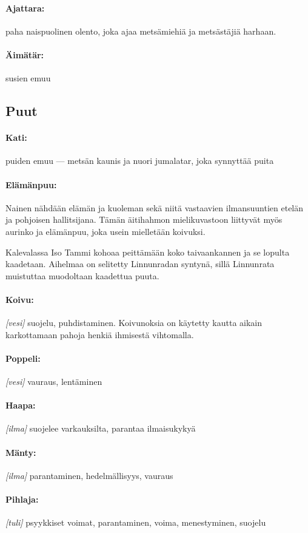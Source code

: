   \paragraph{Ajattara:} paha naispuolinen olento, joka ajaa metsämiehiä ja metsästäjiä harhaan.
  \paragraph{Äimätär:} susien emuu


\subsection{Puut}

  \paragraph{Kati:} puiden emuu --- metsän kaunis ja nuori jumalatar, joka synnyttää puita
  \paragraph{Elämänpuu:} Nainen nähdään elämän ja kuoleman sekä niitä vastaavien ilmansuuntien
    etelän ja pohjoisen hallitsijana. Tämän äitihahmon mielikuvastoon liittyvät myös aurinko ja
    elämänpuu, joka usein mielletään koivuksi. \par
    Kalevalassa Iso Tammi kohoaa peittämään koko taivaankannen ja se lopulta kaadetaan. Aihelmaa
    on selitetty Linnunradan syntynä, sillä Linnunrata muistuttaa muodoltaan kaadettua puuta.
  \paragraph{Koivu:} \emph{[vesi]} suojelu, puhdistaminen. Koivunoksia on käytetty kautta aikain
    karkottamaan pahoja henkiä ihmisestä vihtomalla.
  \paragraph{Poppeli:} \emph{[vesi]} vauraus, lentäminen
  \paragraph{Haapa:} \emph{[ilma]} suojelee varkauksilta, parantaa ilmaisukykyä
  \paragraph{Mänty:} \emph{[ilma]} parantaminen, hedelmällisyys, vauraus
  \paragraph{Pihlaja:} \emph{[tuli]} psyykkiset voimat, parantaminen, voima, menestyminen, suojelu
